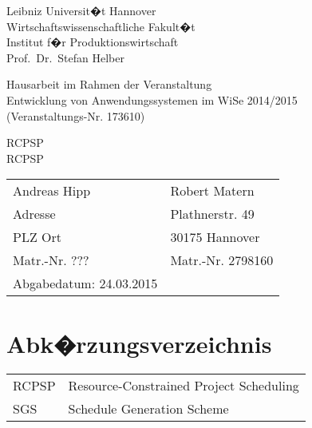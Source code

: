 \documentclass[a4paper,12pt,parskip,bibtotoc,liststotoc]{article}
\begin{document}
%
%
\thispagestyle{empty}  %
Leibniz Universit�t Hannover\\
Wirtschaftswissenschaftliche Fakult�t\\
Institut f�r Produktionswirtschaft\\
Prof.\ Dr.\ Stefan Helber

\vspace{5cm}

\begin{center}
Hausarbeit im Rahmen der Veranstaltung \\
Entwicklung von Anwendungssystemen  im WiSe 2014/2015 \\
(Veranstaltungs-Nr. 173610)

\vspace{2.5cm}

{\Large RCPSP \\
RCPSP}
\end{center}

\vspace{5.5cm}


\begin{table}[h!]
    \vspace*{-3mm}
    \hspace*{2mm}
  \renewcommand{\arraystretch}{1,5}
    \begin{tabular}{ll}
Andreas Hipp &Robert Matern \\
Adresse&Plathnerstr. 49 \\
PLZ Ort&30175 Hannover \\
Matr.-Nr. ???&Matr.-Nr. 2798160 \\[3mm]
Abgabedatum: 24.03.2015
	\end{tabular}
\end{table}

\newpage

\tableofcontents

\newpage  %

\listoffigures

\listoftables
\newpage
\section*{Abk�rzungsverzeichnis}
\begin{table}[h!]
    \vspace*{-3mm}
    \hspace*{2mm}
  \renewcommand{\arraystretch}{1,5}
    \begin{tabular}{ll}  %
           RCPSP      & Resource-Constrained Project Scheduling \\
SGS & Schedule Generation Scheme\\
	\end{tabular}
\end{table}
\newpage
\end{document}
